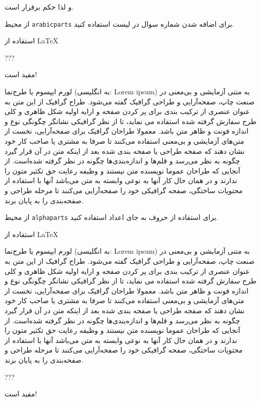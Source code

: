\documentclass[11pt,largemargins]{homework}
\begin{document}
  و لذا حکم برقرار است. 

\question
از محیط   
  \texttt{arabicparts}
برای اضافه شدن شماره سوال در لیست استفاده کنید.  
  \begin{arabicparts}
    \item استفاده از \LaTeX
    \item ???
    \item مفید است!
  \end{arabicparts}

  لورم ایپسوم یا طرح‌نما (به انگلیسی: Lorem ipsum) به متنی آزمایشی و بی‌معنی در صنعت چاپ، صفحه‌آرایی و طراحی گرافیک گفته می‌شود. طراح گرافیک از این متن به عنوان عنصری از ترکیب بندی برای پر کردن صفحه و ارایه اولیه شکل ظاهری و کلی طرح سفارش گرفته شده استفاده می نماید، تا از نظر گرافیکی نشانگر چگونگی نوع و اندازه فونت و ظاهر متن باشد. معمولا طراحان گرافیک برای صفحه‌آرایی، نخست از متن‌های آزمایشی و بی‌معنی استفاده می‌کنند تا صرفا به مشتری یا صاحب کار خود نشان دهند که صفحه طراحی یا صفحه بندی شده بعد از اینکه متن در آن قرار گیرد چگونه به نظر می‌رسد و قلم‌ها و اندازه‌بندی‌ها چگونه در نظر گرفته شده‌است. از آنجایی که طراحان عموما نویسنده متن نیستند و وظیفه رعایت حق تکثیر متون را ندارند و در همان حال کار آنها به نوعی وابسته به متن می‌باشد آنها با استفاده از محتویات ساختگی، صفحه گرافیکی خود را صفحه‌آرایی می‌کنند تا مرحله طراحی و صفحه‌بندی را به پایان برند.

\newpage

\question
از محیط  
  \texttt{alphaparts}
  برای استفاده از حروف به جای اعداد استفاده کنید.
  \begin{alphaparts}
    \item
      استفاده از \LaTeX

      لورم ایپسوم یا طرح‌نما (به انگلیسی: Lorem ipsum) به متنی آزمایشی و بی‌معنی در صنعت چاپ، صفحه‌آرایی و طراحی گرافیک گفته می‌شود. طراح گرافیک از این متن به عنوان عنصری از ترکیب بندی برای پر کردن صفحه و ارایه اولیه شکل ظاهری و کلی طرح سفارش گرفته شده استفاده می نماید، تا از نظر گرافیکی نشانگر چگونگی نوع و اندازه فونت و ظاهر متن باشد. معمولا طراحان گرافیک برای صفحه‌آرایی، نخست از متن‌های آزمایشی و بی‌معنی استفاده می‌کنند تا صرفا به مشتری یا صاحب کار خود نشان دهند که صفحه طراحی یا صفحه بندی شده بعد از اینکه متن در آن قرار گیرد چگونه به نظر می‌رسد و قلم‌ها و اندازه‌بندی‌ها چگونه در نظر گرفته شده‌است. از آنجایی که طراحان عموما نویسنده متن نیستند و وظیفه رعایت حق تکثیر متون را ندارند و در همان حال کار آنها به نوعی وابسته به متن می‌باشد آنها با استفاده از محتویات ساختگی، صفحه گرافیکی خود را صفحه‌آرایی می‌کنند تا مرحله طراحی و صفحه‌بندی را به پایان برند.
    \item ???
    \item مفید است!
  \end{alphaparts}
\end{document}
